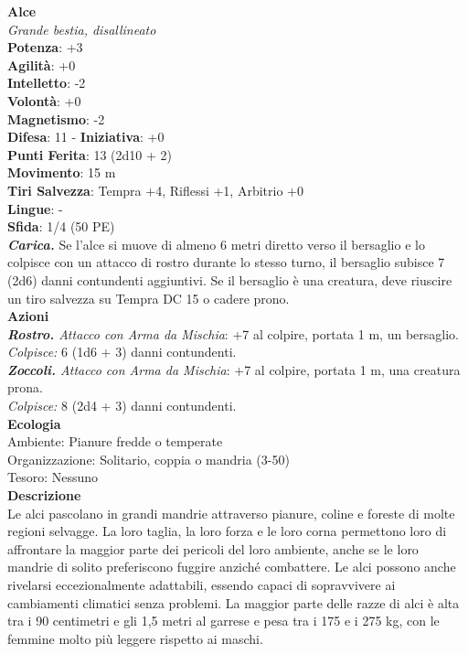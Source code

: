 \begin{multicols}{2}
\medskip\textbf{Alce}\\
\emph{Grande bestia, disallineato}\\
\textbf{Potenza}: +3\\
\textbf{Agilità}: +0\\
\textbf{Intelletto}: -2\\
\textbf{Volontà}: +0\\
\textbf{Magnetismo}: -2\\
\textbf{Difesa}: 11 - \textbf{Iniziativa}: +0\\
\textbf{Punti Ferita}: 13 (2d10 + 2)\\
\textbf{Movimento}: 15 m\\
\textbf{Tiri Salvezza}:  Tempra +4, Riflessi +1, Arbitrio +0\\
\textbf{Lingue}: -\\
\textbf{Sfida}: 1/4 (50 PE)\smallskip\\
\emph{\textbf{Carica.}} Se l'alce si muove di almeno 6 metri diretto verso il bersaglio e lo colpisce con un attacco di rostro durante lo stesso turno, il bersaglio subisce 7 (2d6) danni contundenti aggiuntivi. Se il bersaglio è una creatura, deve riuscire un tiro salvezza su Tempra DC  15 o cadere prono.\\
\smallskip\textbf{Azioni}\\
\emph{\textbf{Rostro.} Attacco con Arma da Mischia}: +7 al colpire, portata 1 m, un bersaglio.\\
\emph{Colpisce:} 6 (1d6 + 3) danni contundenti.\\
\emph{\textbf{Zoccoli.} Attacco con Arma da Mischia}: +7 al colpire, portata 1 m, una creatura prona.\\
\emph{Colpisce:} 8 (2d4 + 3) danni contundenti.\\
\textbf{Ecologia}\\
Ambiente: Pianure fredde o temperate\\
Organizzazione: Solitario, coppia o mandria (3-50)\\
Tesoro: Nessuno\\
\textbf{Descrizione}\\
Le alci pascolano in grandi mandrie attraverso pianure, coline e foreste di molte regioni selvagge. La loro taglia, la loro forza e le loro corna permettono loro di affrontare la maggior parte dei pericoli del loro ambiente, anche se le loro mandrie di solito preferiscono fuggire anziché combattere. Le alci possono anche rivelarsi eccezionalmente adattabili, essendo capaci di sopravvivere ai cambiamenti climatici senza problemi. La maggior parte delle razze di alci è alta tra i 90 centimetri e gli 1,5 metri al garrese e pesa tra i 175 e i 275 kg, con le femmine molto più leggere rispetto ai maschi.\\


\end{multicols}
